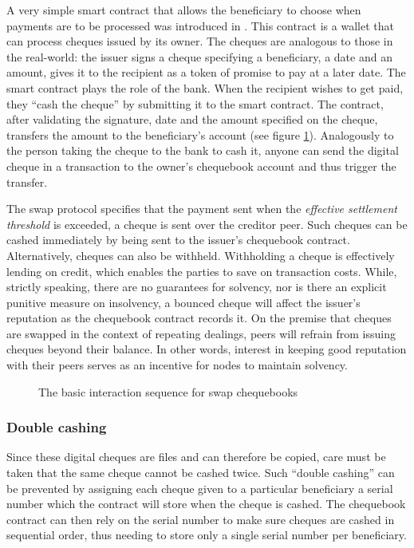 A very simple smart contract that allows the beneficiary to choose when payments are to be processed was introduced in \cite{ethersphere2016sw3}. This  contract is a wallet that can process cheques issued by its owner. The cheques are analogous to those in the real-world: the issuer signs a cheque specifying a beneficiary, a date and an amount, gives it to the recipient as a token of promise to pay at a later date. The smart contract plays the role of the bank. When the recipient wishes to get paid, they ``cash the cheque'' by submitting it to the smart contract. The contract, after validating the signature, date and the amount specified on the cheque, transfers the amount to the beneficiary's account (see figure \ref{fig:swap-chequebook}). Analogously to the person taking the cheque to the bank to cash it, anyone can send the digital cheque in a transaction to the owner's chequebook account and thus trigger the transfer. 

The swap protocol specifies that the payment sent when the \emph{effective settlement threshold} is exceeded, a cheque is sent over the creditor peer. Such cheques can be cashed immediately by being sent to the issuer's chequebook contract. Alternatively, cheques can also be withheld. Withholding a cheque is effectively lending on credit, which enables the parties to save on transaction costs. While, strictly speaking, there are no guarantees for solvency, nor is there an explicit punitive measure on insolvency, a bounced cheque will affect the issuer's reputation as the chequebook contract records it. On the premise that cheques are swapped in the context of repeating dealings, peers will refrain from issuing cheques beyond their balance. In other words, interest in keeping good reputation with their peers serves as an incentive for nodes to maintain solvency.


\begin{figure}[htbp]
\centering

\caption[The basic interaction sequence for swap chequebooks]{The basic interaction sequence for swap chequebooks}
\label{fig:swap-chequebook}
\end{figure}


\subsubsection{Double cashing}

Since these digital cheques are files and can therefore be copied, care must be taken that the same cheque cannot be cashed twice. Such ``double cashing'' can be prevented by assigning each cheque given to a particular beneficiary a serial number which the contract will store when the cheque is cashed. The chequebook contract can then rely on the serial number to make sure cheques are cashed in sequential order, thus needing to store only a single serial number per beneficiary.


